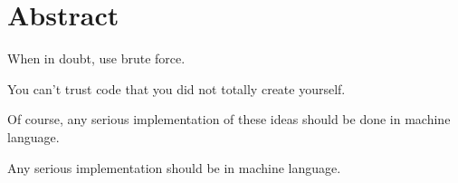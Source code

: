 \chapter*{Abstract}
\label{sec:abstract}



\begin{myquote}
When in doubt, use brute force.
\end{myquote}

\begin{myquote}
You can't trust code that you did not totally create yourself.
\end{myquote}

\begin{myquote}
Of course, any serious implementation of these ideas should be done in machine language.
\end{myquote}

\begin{myquote}
	Any serious implementation should be in machine language.
\end{myquote}

\lipsum[1]

\clearpage